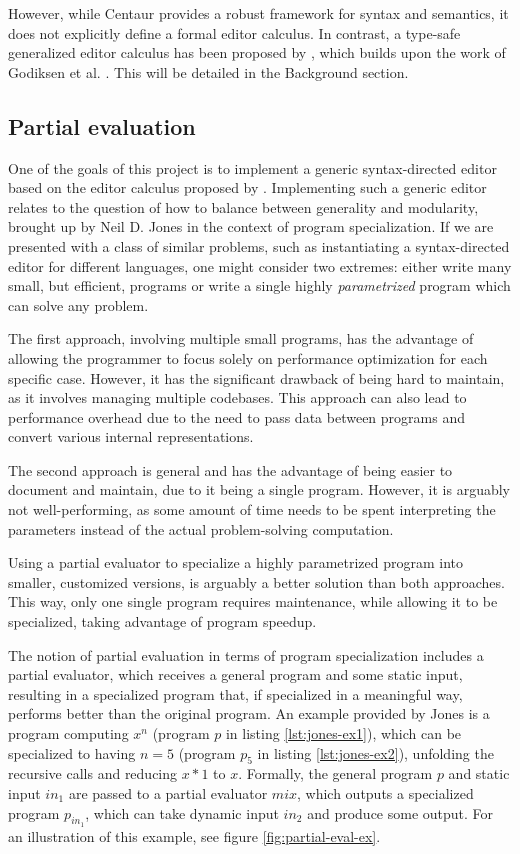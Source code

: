 However, while Centaur provides a robust framework for syntax and semantics, it does not explicitly define a formal editor calculus. In contrast, a type-safe generalized editor calculus has been proposed by \cite{aalborg}, which builds upon the work of Godiksen et al. \cite{godiksen}. This will be detailed in the Background section.

\subsection{Partial evaluation}
One of the goals of this project is to implement a generic syntax-directed editor based on the editor calculus proposed by \cite{aalborg}. Implementing such a generic editor relates to the question of how to balance between generality and modularity, brought up by Neil D. Jones\cite{jones-partial-evaluation} in the context of program specialization. If we are presented with a class of similar problems, such as instantiating a syntax-directed editor for different languages, one might consider two extremes: either write many small, but efficient, programs or write a single highly \textit{parametrized} program which can solve any problem.

The first approach, involving multiple small programs, has the advantage of allowing the programmer to focus solely on performance optimization for each specific case. However, it has the significant drawback of being hard to maintain, as it involves managing multiple codebases. This approach can also lead to performance overhead due to the need to pass data between programs and convert various internal representations.

The second approach is general and has the advantage of being easier to document and maintain, due to it being a single program. However, it is arguably not well-performing, as some amount of time needs to be spent interpreting the parameters instead of the actual problem-solving computation.

Using a partial evaluator\cite{jones96} to specialize a highly parametrized program into smaller, customized versions, is arguably a better solution than both approaches. This way, only one single program requires maintenance, while allowing it to be specialized, taking advantage of program speedup.

The notion of partial evaluation in terms of program specialization\cite{jones96} includes a partial evaluator, which receives a general program and some static input, resulting in a specialized program that, if specialized in a meaningful way, performs better than the original program. An example provided by Jones is a program computing $x^n$ (program $p$ in listing \ref{lst:jones-ex1}), which can be specialized to having $n = 5$ (program $p_5$ in listing \ref{lst:jones-ex2}), unfolding the recursive calls and reducing $x*1$ to $x$. Formally, the general program $p$ and static input $in_1$ are passed to a partial evaluator $mix$, which outputs a specialized program $p_{in_1}$, which can take dynamic input $in_2$ and produce some output. For an illustration of this example, see figure \ref{fig:partial-eval-ex}.

